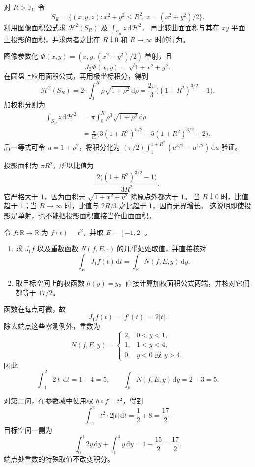 \begin{exercise}\label{b1:ex:17-paraboloid-area}
对 \(R>0\)，令
\[
 S_R=\{(x,y,z):x^2+y^2\le R^2,\ z=(x^2+y^2)/2\}.
\]
利用图像面积公式求 \(\mathcal H^2(S_R)\) 及
\(\int_{S_R}z\,\mathrm d\mathcal H^2\)。
再比较曲面面积与其在 \(xy\) 平面上投影的面积，并求两者之比在 \(R\downarrow0\) 和 \(R\to\infty\) 时的行为。
\end{exercise}
\begin{solution}
图像参数化 \(\Phi(x,y)=(x,y,(x^2+y^2)/2)\) 单射，且
\[
 J_2\Phi(x,y)=\sqrt{1+x^2+y^2}.
\]
在圆盘上应用面积公式，再用极坐标积分，得到
\[
 \mathcal H^2(S_R)
 =2\pi\int_0^R\rho\sqrt{1+\rho^2}\,\mathrm d\rho
 =\frac{2\pi}{3}\bigl((1+R^2)^{3/2}-1\bigr).
\]
加权积分则为
\begin{align*}
 \int_{S_R}z\,\mathrm d\mathcal H^2
 &=\pi\int_0^R\rho^3\sqrt{1+\rho^2}\,\mathrm d\rho\\
 &=\frac\pi{15}\bigl(3(1+R^2)^{5/2}-5(1+R^2)^{3/2}+2\bigr).
\end{align*}
后一等式可令 \(u=1+\rho^2\)，将积分化为 \((\pi/2)\int_1^{1+R^2}(u^{3/2}-u^{1/2})\,\mathrm du\) 验证。

投影面积为 \(\pi R^2\)，所以比值为
\[
 \frac{2\bigl((1+R^2)^{3/2}-1\bigr)}{3R^2}.
\]
它严格大于 \(1\)，因为面积元 \(\sqrt{1+x^2+y^2}\) 除原点外都大于 \(1\)。
当 \(R\downarrow0\) 时，比值趋于 \(1\)；当 \(R\to\infty\) 时，比值与 \(2R/3\) 之比趋于 \(1\)，因而无界增长。
这说明即使投影是单射，也不能把投影面积直接当作曲面面积。
\end{solution}

\begin{exercise}[一维面积公式的直接核对]\label{b1:ex:17-basic-area-formula}
令 \(f:\mathbb R\to\mathbb R\) 为 \(f(t)=t^2\)，并取 \(E=[-1,2]\)。
\begin{enumerate}
\item 求 \(J_1f\) 以及重数函数 \(N(f,E,\cdot)\) 的几乎处处取值，并直接核对
\[
 \int_EJ_1f(t)\,\mathrm dt
 =\int_{\mathbb R}N(f,E,y)\,\mathrm dy.
\]
\item 取目标空间上的权函数 \(h(y)=y\)。直接计算加权面积公式两端，并核对它们都等于 \(17/2\)。
\end{enumerate}
\end{exercise}
\begin{solution}
函数在每点可微，故
\[
 J_1f(t)=|f'(t)|=2|t|.
\]
除去端点这些零测例外，重数为
\[
 N(f,E,y)=
 \begin{cases}
 2,&0<y<1,\\
 1,&1<y<4,\\
 0,&y<0\text{ 或 }y>4.
 \end{cases}
\]
因此
\[
 \int_{-1}^{2}2|t|\,\mathrm dt=1+4=5,
 \qquad
 \int_{\mathbb R}N(f,E,y)\,\mathrm dy=2+3=5.
\]

对第二问，在参数域中使用权 \(h\circ f=t^2\)，得到
\[
 \int_{-1}^{2}t^2\cdot2|t|\,\mathrm dt
 =\frac12+8=\frac{17}{2}.
\]
目标空间一侧为
\[
 \int_0^1 2y\,\mathrm dy+\int_1^4y\,\mathrm dy
 =1+\frac{15}{2}=\frac{17}{2}.
\]
端点处重数的特殊取值不改变积分。
\end{solution}


